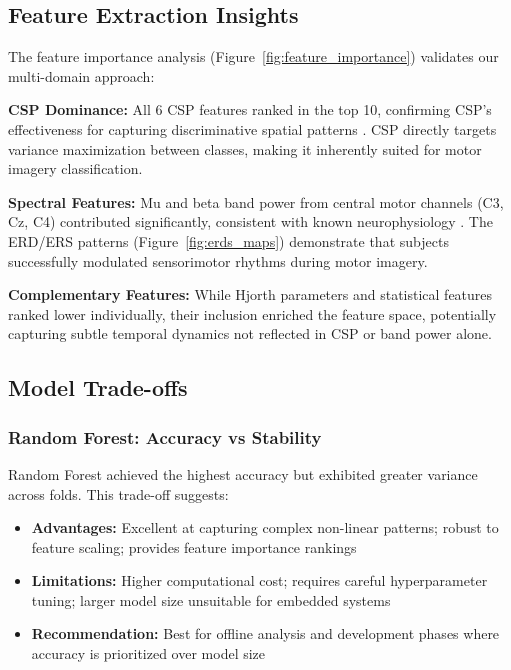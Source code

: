 \documentclass[11pt]{article}
\begin{document}
\subsection{Feature Extraction Insights}

The feature importance analysis (Figure~\ref{fig:feature_importance}) validates our multi-domain approach:

\textbf{CSP Dominance:} All 6 CSP features ranked in the top 10, confirming CSP's effectiveness for capturing discriminative spatial patterns \citep{ramoser2000optimal}. CSP directly targets variance maximization between classes, making it inherently suited for motor imagery classification.

\textbf{Spectral Features:} Mu and beta band power from central motor channels (C3, Cz, C4) contributed significantly, consistent with known neurophysiology \citep{pfurtscheller1999motor}. The ERD/ERS patterns (Figure~\ref{fig:erds_maps}) demonstrate that subjects successfully modulated sensorimotor rhythms during motor imagery.

\textbf{Complementary Features:} While Hjorth parameters \citep{hjorth1970eeg} and statistical features ranked lower individually, their inclusion enriched the feature space, potentially capturing subtle temporal dynamics not reflected in CSP or band power alone.

\subsection{Model Trade-offs}

\subsubsection{Random Forest: Accuracy vs Stability}

Random Forest achieved the highest accuracy but exhibited greater variance across folds. This trade-off suggests:

\begin{itemize}
    \item \textbf{Advantages:} Excellent at capturing complex non-linear patterns; robust to feature scaling; provides feature importance rankings
    \item \textbf{Limitations:} Higher computational cost; requires careful hyperparameter tuning; larger model size unsuitable for embedded systems
    \item \textbf{Recommendation:} Best for offline analysis and development phases where accuracy is prioritized over model size
\end{itemize}
\end{document}
